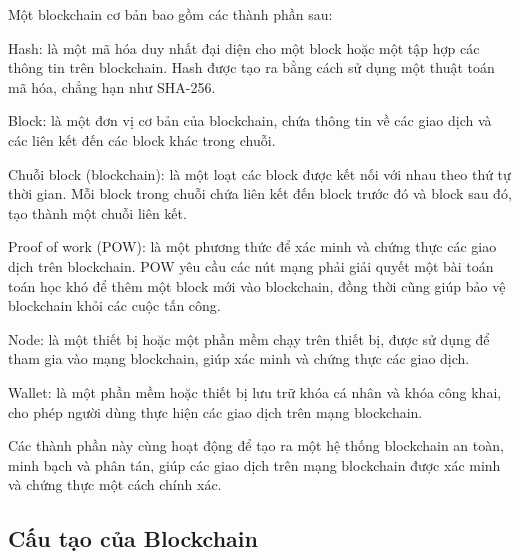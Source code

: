 Một blockchain cơ bản bao gồm các thành phần sau:

Hash: là một mã hóa duy nhất đại diện cho một block hoặc một tập hợp các thông tin trên blockchain. Hash được tạo ra bằng cách sử dụng một thuật toán mã hóa, chẳng hạn như SHA-256.

Block: là một đơn vị cơ bản của blockchain, chứa thông tin về các giao dịch và các liên kết đến các block khác trong chuỗi.

Chuỗi block (blockchain): là một loạt các block được kết nối với nhau theo thứ tự thời gian. Mỗi block trong chuỗi chứa liên kết đến block trước đó và block sau đó, tạo thành một chuỗi liên kết.

Proof of work (POW): là một phương thức để xác minh và chứng thực các giao dịch trên blockchain. POW yêu cầu các nút mạng phải giải quyết một bài toán toán học khó để thêm một block mới vào blockchain, đồng thời cũng giúp bảo vệ blockchain khỏi các cuộc tấn công.

Node: là một thiết bị hoặc một phần mềm chạy trên thiết bị, được sử dụng để tham gia vào mạng blockchain, giúp xác minh và chứng thực các giao dịch.

Wallet: là một phần mềm hoặc thiết bị lưu trữ khóa cá nhân và khóa công khai, cho phép người dùng thực hiện các giao dịch trên mạng blockchain.

Các thành phần này cùng hoạt động để tạo ra một hệ thống blockchain an toàn, minh bạch và phân tán, giúp các giao dịch trên mạng blockchain được xác minh và chứng thực một cách chính xác.

\subsection{Cấu tạo của Blockchain}

